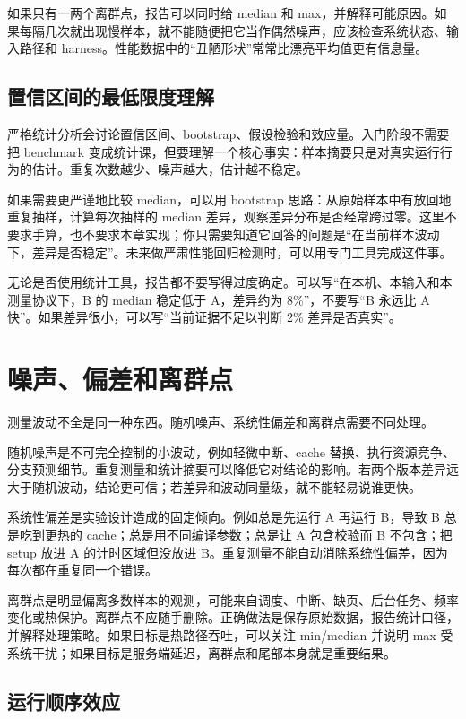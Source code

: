 如果只有一两个离群点，报告可以同时给 median 和 max，并解释可能原因。如果每隔几次就出现慢样本，就不能随便把它当作偶然噪声，应该检查系统状态、输入路径和 harness。性能数据中的“丑陋形状”常常比漂亮平均值更有信息量。

\subsection{置信区间的最低限度理解}

严格统计分析会讨论置信区间、bootstrap、假设检验和效应量。入门阶段不需要把 benchmark 变成统计课，但要理解一个核心事实：样本摘要只是对真实运行行为的估计。重复次数越少、噪声越大，估计越不稳定。

如果需要更严谨地比较 median，可以用 bootstrap 思路：从原始样本中有放回地重复抽样，计算每次抽样的 median 差异，观察差异分布是否经常跨过零。这里不要求手算，也不要求本章实现；你只需要知道它回答的问题是“在当前样本波动下，差异是否稳定”。未来做严肃性能回归检测时，可以用专门工具完成这件事。

无论是否使用统计工具，报告都不要写得过度确定。可以写“在本机、本输入和本测量协议下，B 的 median 稳定低于 A，差异约为 8\%”，不要写“B 永远比 A 快”。如果差异很小，可以写“当前证据不足以判断 2\% 差异是否真实”。

\section{噪声、偏差和离群点}

测量波动不全是同一种东西。随机噪声、系统性偏差和离群点需要不同处理。

随机噪声是不可完全控制的小波动，例如轻微中断、cache 替换、执行资源竞争、分支预测细节。重复测量和统计摘要可以降低它对结论的影响。若两个版本差异远大于随机波动，结论更可信；若差异和波动同量级，就不能轻易说谁更快。

系统性偏差是实验设计造成的固定倾向。例如总是先运行 A 再运行 B，导致 B 总是吃到更热的 cache；总是用不同编译参数；总是让 A 包含校验而 B 不包含；把 setup 放进 A 的计时区域但没放进 B。重复测量不能自动消除系统性偏差，因为每次都在重复同一个错误。

离群点是明显偏离多数样本的观测，可能来自调度、中断、缺页、后台任务、频率变化或热保护。离群点不应随手删除。正确做法是保存原始数据，报告统计口径，并解释处理策略。如果目标是热路径吞吐，可以关注 min/median 并说明 max 受系统干扰；如果目标是服务端延迟，离群点和尾部本身就是重要结果。

\subsection{运行顺序效应}

